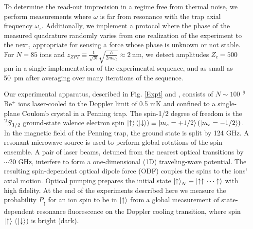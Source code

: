 \documentclass[aps,prl,twocolumn,superscriptaddress,floatfix]{revtex4-1}
\begin{document}
To determine the read-out imprecision in a regime free from thermal noise, we perform measurements where $\omega$ is far from resonance with the trap axial frequency $\omega_z$. Additionally, we implement a protocol where the phase of the measured quadrature randomly varies from one realization of the experiment to the next, appropriate for sensing a force whose phase is unknown or not stable. For $N = 85$ ions and $z_{ZPT} \equiv \frac{1}{\sqrt{N}}\sqrt{\frac{\hbar}{2m\omega_z}} \approx 2\:\mathrm{nm}$, we detect amplitudes $Z_c=500$ pm in a single implementation of the experimental sequence, and as small as 50~pm after averaging over many iterations of the sequence.

Our experimental apparatus, described in Fig. \ref{Expt} and , consists of $N\sim100$ $\prescript{9}{}{}$Be$^{+}$ ions laser-cooled to the Doppler limit of 0.5 mK and confined to a single-plane Coulomb crystal in a Penning trap. The spin-1/2 degree of freedom is the $\prescript{2}{}{S}_{1/2}$ ground-state valence electron spin $\ket{\uparrow} (\ket{\downarrow}) \equiv \ket{m_{s}=+1/2} (\ket{m_{s}=-1/2}) $. In the magnetic field of the Penning trap, the ground state is split by 124 GHz. A resonant microwave source is used to perform global rotations of the spin ensemble. A pair of laser beams, detuned from the nearest optical transitions by $\sim$20 GHz, interfere to form a one-dimensional (1D) traveling-wave potential. The resulting spin-dependent optical dipole force (ODF) couples the spins to the ions' axial motion. Optical pumping prepares the initial state $\ket{\uparrow}_N \equiv \ket{\uparrow \uparrow \cdots \uparrow}$ with high fidelity. At the end of the experiments described here we measure the probability $P_\uparrow$ for an ion spin to be in $\ket{\uparrow}$ from a global measurement of state-dependent resonance fluorescence on the Doppler cooling transition, where spin $\ket{\uparrow}$ ($\ket{\downarrow}$) is bright (dark).
\end{document}
